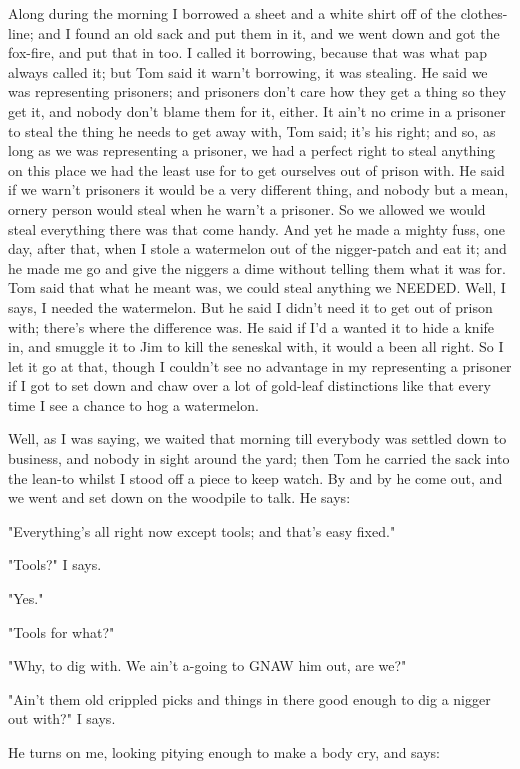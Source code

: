 Along during the morning I borrowed a sheet and a white shirt off of the
clothes-line; and I found an old sack and put them in it, and we went
down and got the fox-fire, and put that in too.  I called it borrowing,
because that was what pap always called it; but Tom said it warn't
borrowing, it was stealing.  He said we was representing prisoners; and
prisoners don't care how they get a thing so they get it, and nobody
don't blame them for it, either.  It ain't no crime in a prisoner to
steal the thing he needs to get away with, Tom said; it's his right; and
so, as long as we was representing a prisoner, we had a perfect right to
steal anything on this place we had the least use for to get ourselves
out of prison with.  He said if we warn't prisoners it would be a very
different thing, and nobody but a mean, ornery person would steal when he
warn't a prisoner.  So we allowed we would steal everything there was
that come handy.  And yet he made a mighty fuss, one day, after that,
when I stole a watermelon out of the nigger-patch and eat it; and he made
me go and give the niggers a dime without telling them what it was for.
Tom said that what he meant was, we could steal anything we NEEDED. Well,
I says, I needed the watermelon.  But he said I didn't need it to get out
of prison with; there's where the difference was.  He said if I'd a
wanted it to hide a knife in, and smuggle it to Jim to kill the seneskal
with, it would a been all right.  So I let it go at that, though I
couldn't see no advantage in my representing a prisoner if I got to set
down and chaw over a lot of gold-leaf distinctions like that every time I
see a chance to hog a watermelon.

Well, as I was saying, we waited that morning till everybody was settled
down to business, and nobody in sight around the yard; then Tom he
carried the sack into the lean-to whilst I stood off a piece to keep
watch.  By and by he come out, and we went and set down on the woodpile
to talk.  He says:

"Everything's all right now except tools; and that's easy fixed."

"Tools?"  I says.

"Yes."

"Tools for what?"

"Why, to dig with.  We ain't a-going to GNAW him out, are we?"

"Ain't them old crippled picks and things in there good enough to dig a
nigger out with?"  I says.

He turns on me, looking pitying enough to make a body cry, and says:

